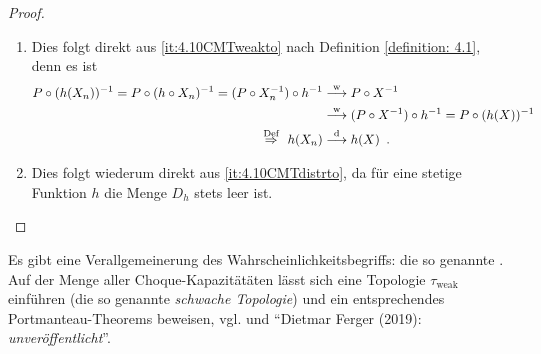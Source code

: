 \begin{proof}
\begin{enumerate}[label=(zu \arabic*), leftmargin=*]
		\item Dies folgt direkt aus \ref{it:4.10CMTweakto} nach Definition \cref{definition: 4.1}, denn es ist
		\begin{align*}
			P \circ (h(X_n))^{-1} = P \circ (h \circ X_n)^{-1} = (P \circ X_n^{-1}) \circ h^{-1}
			&\mathrel{\overset{\text{w}}{\longrightarrow}} P \circ X^{-1} \\
			&\mathrel{\overset{\text{w}}{\longrightarrow}} (P  \circ X^{-1}) \circ h^{-1} = P \circ (h(X))^{-1} \\
			\overset{\text{Def}}{\enskip \Rightarrow \enskip} h(X_n) &\mathrel{\overset{\mathrm{d}}{\longrightarrow}} h(X) \enskip \text{.}
		\end{align*}
		\item Dies folgt wiederum direkt aus \ref{it:4.10CMTdistrto}, da für eine stetige Funktion $h$ die Menge $D_h$ stets leer ist.
	\end{enumerate}
\end{proof}

\begin{bemerkung}  
	\label{note: choque_kapazitat}
	Es gibt eine Verallgemeinerung des Wahrscheinlichkeitsbegriffs: die so genannte . Auf der Menge aller Choque-Kapazitätäten lässt sich eine Topologie $\tau_{\text{weak}}$ einführen (die so genannte \emph{schwache Topologie}) und ein entsprechendes Portmanteau-Theorems beweisen, vgl. \cite{Ferger2018WeakCO} und \enquote{Dietmar Ferger (2019): \textsl{unveröffentlicht}}.
\end{bemerkung}
